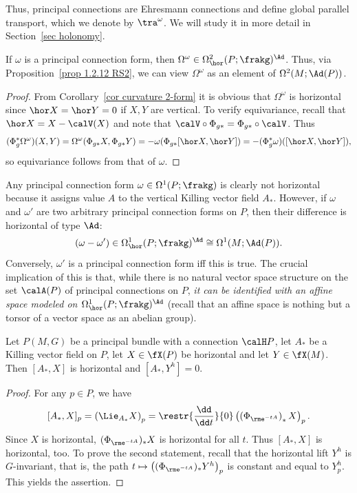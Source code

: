 Thus, principal connections are Ehresmann connections and define global parallel transport, which we denote by $\tra^\omega$. We will study it in more detail in Section~\ref{sec holonomy}.


\begin{cor}
    If $\omega$ is a principal connection form, then $\Omega^\omega\in \Omega^2_{\hor}(P;\frakg)^\Ad$. Thus, via Proposition~\ref{prop 1.2.12 RS2}, we can view $\Omega^\omega$ as an element of $\Omega^2(M;\Ad(P))$.
\end{cor}
\begin{proof}
    From Corollary~\ref{cor curvature 2-form} it is obvious that $\Omega^\omega$ is horizontal since $\hor X=\hor Y=0$ if $X,Y$ are vertical. To verify equivariance, recall that $\hor X=X-\calV(X)$ and note that $\calV\circ \Phi_{g\ast}=\Phi_{g\ast}\circ \calV$. Thus 
    \[(\Phi_{g}^\ast\Omega^\omega)(X,Y)=\Omega^\omega(\Phi_{g\ast}X,\Phi_{g\ast}Y)=-\omega(\Phi_{g\ast}[\hor X,\hor Y])=-(\Phi_{g}^\ast\omega)([\hor X,\hor Y]),\]
    so equivariance follows from that of $\omega$.
\end{proof}


\begin{rem}
    Any principal connection form $\omega\in\Omega^1(P;\frakg)$ is clearly not horizontal because it assigns value $A$ to the vertical Killing vector field $A_\ast$. 
    However, if $\omega$ and $\omega'$ are two arbitrary principal connection forms on $P$, then their difference is horizontal of type $\Ad$:
    \[(\omega-\omega')\in \Omega^1_{\hor}(P;\frakg)^\Ad\cong \Omega^1(M;\Ad(P)).\]
    Conversely, $\omega'$ is a principal connection form iff this is true. The crucial implication of this is that, while there is no natural vector space structure on the set $\calA(P)$ of principal connections on $P$, \emph{it can be identified with an affine space modeled on $\Omega^1_{\hor}(P;\frakg)^\Ad$} (recall that an affine space is nothing but a torsor of a vector space as an abelian group).
\end{rem}


\begin{lem}[{{\cite[Lem.~1.4.2]{RS2}}}]\label{lem 1.4.2 RS2}
    Let $P(M,G)$ be a principal bundle with a connection $\calH P$, let $A_\ast$ be a Killing vector field on $P$, let $X\in\fX(P)$ be horizontal and let $Y\in \fX(M)$. Then $[A_\ast,X]$ is horizontal and $[A_\ast,Y^h]=0$.
\end{lem}
\begin{proof}
    For any $p\in P$, we have
    \[[A_\ast,X]_p=\left(\Lie_{A_\ast}X\right)_p=\restr{\frac{\dd}{\dd t}}{0} \left(\left(\Phi_{\rme^{-tA}}\right)_\ast X\right)_p.\]
    Since $X$ is horizontal, $(\Phi_{\rme^{-tA}})_\ast X$ is horizontal for all $t$. Thus $[A_\ast,X]$ is horizontal, too. To prove the second statement, recall that the horizontal lift $Y^h$ is $G$-invariant, that is, the path $t\mapsto \left((\Phi_{\rme^{-tA}})_\ast Y^h\right)_p$ is constant and equal to $Y^h_p$. This yields the assertion.
\end{proof}


